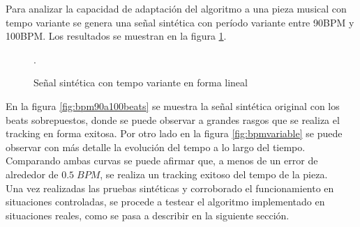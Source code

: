 \documentclass[12pt,a4paper,titlepage]{report}
\begin{document}
Para analizar la capacidad de adaptación del algoritmo a una pieza musical con tempo variante se genera una señal sintética con período variante entre 90BPM y 100BPM. Los resultados se muestran en la figura \ref{fig:tempovariante}.

\begin{figure} [h!]
\centering
  \caption{Señal sintética con tempo variante en forma lineal}
  \label{fig:tempovariante}.
\end{figure}

En la figura \ref{fig:bpm90a100beats} se muestra la señal sintética original con los beats sobrepuestos, donde se puede observar a grandes rasgos que se realiza el tracking en forma exitosa. Por otro lado en la figura \ref{fig:bpmvariable} se puede observar con más detalle la evolución del tempo a lo largo del tiempo. Comparando ambas curvas se puede afirmar que, a menos de un error de alrededor de $0.5\;BPM$, se realiza un tracking exitoso del tempo de la pieza.\\

Una vez realizadas las pruebas sintéticas y corroborado el funcionamiento en situaciones controladas, se procede a testear el algoritmo implementado en situaciones reales, como se pasa a describir en la siguiente sección.
\end{document}
